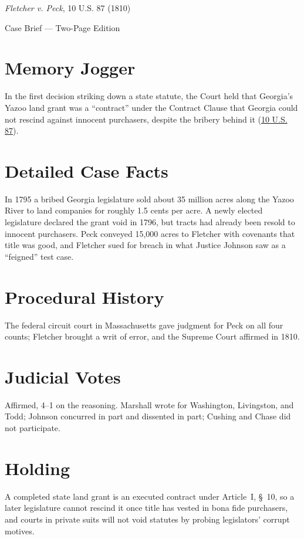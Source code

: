 \documentclass[12pt]{article}
\begin{document}
\begin{center}
{\LARGE \textit{Fletcher v. Peck}, 10 U.S. 87 (1810)\par}
\vspace{0.5em}
{\large Case Brief --- Two-Page Edition\par}
\end{center}

\section{Memory Jogger}
In the first decision striking down a state statute, the Court held that Georgia's Yazoo land grant was a ``contract'' under the Contract Clause that Georgia could not rescind against innocent purchasers, despite the bribery behind it (\href{https://www.courtlistener.com/opinion/84935/fletcher-v-peck/}{10 U.S. 87}).

\section{Detailed Case Facts}
In 1795 a bribed Georgia legislature sold about 35 million acres along the Yazoo River to land companies for roughly 1.5 cents per acre. A newly elected legislature declared the grant void in 1796, but tracts had already been resold to innocent purchasers. Peck conveyed 15,000 acres to Fletcher with covenants that title was good, and Fletcher sued for breach in what Justice Johnson saw as a ``feigned'' test case.

\section{Procedural History}
The federal circuit court in Massachusetts gave judgment for Peck on all four counts; Fletcher brought a writ of error, and the Supreme Court affirmed in 1810.

\section{Judicial Votes}
Affirmed, 4--1 on the reasoning. Marshall wrote for Washington, Livingston, and Todd; Johnson concurred in part and dissented in part; Cushing and Chase did not participate.

\section{Holding}
A completed state land grant is an executed contract under Article~I, \S~10, so a later legislature cannot rescind it once title has vested in bona fide purchasers, and courts in private suits will not void statutes by probing legislators' corrupt motives.
\end{document}
